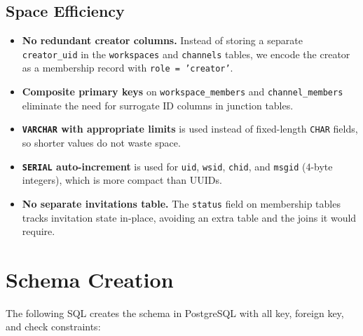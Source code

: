\documentclass[11pt]{article}
\begin{document}
\subsection{Space Efficiency}

\begin{itemize}
    \item \textbf{No redundant creator columns.} Instead of storing a separate \texttt{creator\_uid} in the \texttt{workspaces} and \texttt{channels} tables, we encode the creator as a membership record with \texttt{role = 'creator'}.
    \item \textbf{Composite primary keys} on \texttt{workspace\_members} and \texttt{channel\_members} eliminate the need for surrogate ID columns in junction tables.
    \item \textbf{\texttt{VARCHAR} with appropriate limits} is used instead of fixed-length \texttt{CHAR} fields, so shorter values do not waste space.
    \item \textbf{\texttt{SERIAL} auto-increment} is used for \texttt{uid}, \texttt{wsid}, \texttt{chid}, and \texttt{msgid} (4-byte integers), which is more compact than UUIDs.
    \item \textbf{No separate invitations table.} The \texttt{status} field on membership tables tracks invitation state in-place, avoiding an extra table and the joins it would require.
\end{itemize}



\newpage
\section{Schema Creation}
\label{sec:creation}

The following SQL creates the schema in PostgreSQL with all key, foreign key, and check constraints:
\end{document}
